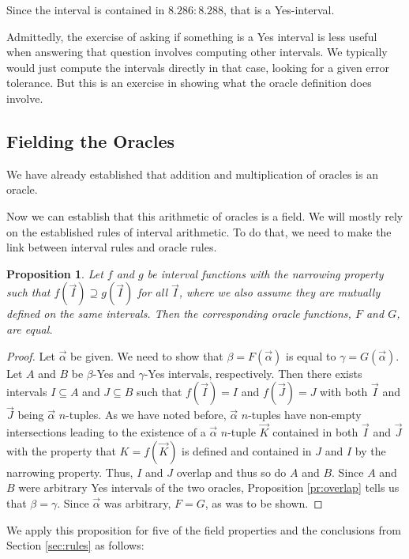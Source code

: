 \documentclass[12pt]{article}
\newtheorem{proposition}{Proposition}
\theoremstyle{remark}
\begin{document}
Since the interval is contained in $8.286:8.288$, that is a Yes-interval. 

Admittedly, the exercise of asking if something is a Yes interval is less useful when answering that question involves computing other intervals. We typically would just compute the intervals directly in that case, looking for a given error tolerance. But this is an exercise in showing what the oracle definition does involve.


\subsection{Fielding the Oracles}

We have already established that addition and multiplication of oracles is an oracle. 


Now we can establish that this arithmetic of oracles is a field. We will mostly rely on the established rules of interval arithmetic. To do that, we need to make the link between interval rules and oracle rules. 


\begin{proposition}
Let $f$ and $g$ be interval functions with the narrowing property such that $f(\vec{I}) \supseteq g(\vec{I})$ for all $\vec{I}$, where we also assume they are mutually defined on the same intervals. Then the corresponding oracle functions, $F$ and $G$, are equal.  
\end{proposition}

\begin{proof}
Let $\vec{\alpha}$ be given. We need to show that $\beta = F(\vec{\alpha})$ is equal to $\gamma =  G(\vec{\alpha})$. Let $A$ and $B$ be $\beta$-Yes and $\gamma$-Yes intervals, respectively. Then there exists intervals $I \subseteq A$ and  $J \subseteq B$  such that $f(\vec{I}) = I$ and $f(\vec{J}) = J$ with both  $\vec{I}$ and $\vec{J}$ being $\vec{\alpha}$ $n$-tuples. As we have noted before, $\vec{\alpha}$ $n$-tuples have non-empty intersections leading to the existence of a $\vec{\alpha}$ $n$-tuple $\vec{K}$ contained in both $\vec{I}$ and $\vec{J}$ with the property that $K = f(\vec{K})$ is defined and contained in $J$ and $I$ by the narrowing property. Thus, $I$ and $J$ overlap and thus so do $A$ and $B$. Since $A$ and $B$ were arbitrary Yes intervals of the two oracles, Proposition \ref{pr:overlap} tells us that $\beta = \gamma$. Since $\vec{\alpha}$ was arbitrary, $F = G$, as was to be shown.
\end{proof}

We apply this proposition for five of the field properties and the conclusions from Section \ref{sec:rules} as follows: 
\end{document}
